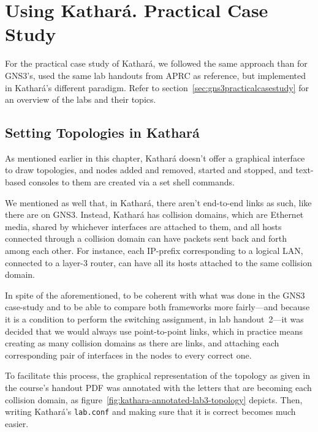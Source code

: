 \section{Using Kathará. Practical Case Study}
\label{sec:katharapracticalcasestudy}

For the practical case study of Kathará, we followed the same approach than for GNS3's, used the same lab handouts from APRC as reference, but implemented in Kathará's different paradigm.
Refer to section~\ref{sec:gns3practicalcasestudy} for an overview of the labs and their topics.

\subsection{Setting Topologies in Kathará}

As mentioned earlier in this chapter, Kathará doesn't offer a graphical interface to draw topologies, and nodes added and removed, started and stopped, and text-based consoles to them are created via a set shell commands.

We mentioned as well that, in Kathará, there aren't end-to-end links as such, like there are on GNS3.
Instead, Kathará has collision domains, which are Ethernet media, shared by whichever interfaces are attached to them, and all hosts connected through a collision domain can have packets sent back and forth among each other.
For instance, each IP-prefix corresponding to a logical LAN, connected to a layer-3 router, can have all its hosts attached to the same collision domain.

In spite of the aforementioned, to be coherent with what was done in the GNS3 case-study and to be able to compare both frameworks more fairly---and because it is a condition to perform the switching assignment, in lab handout~2---it was decided that we would always use point-to-point links, which in practice means creating as many collision domains as there are links, and attaching each corresponding pair of interfaces in the nodes to every correct one. %



To facilitate this process, the graphical representation of the topology as given in the course's handout PDF was annotated with the letters that are becoming each collision domain, as figure~\ref{fig:kathara-annotated-lab3-topology} depicts. %
Then, writing Kathará's \texttt{lab.conf} and making sure that it is correct becomes much easier.

